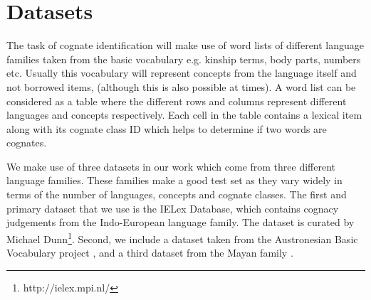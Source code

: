 \documentclass[11pt,letterpaper]{article}
\begin{document}




\section{Datasets}

The task of cognate identification will make use of word lists of different language families taken from the basic vocabulary e.g. kinship terms, body parts, numbers etc. Usually this vocabulary will represent concepts from the language itself and not borrowed items, (although this is also possible at times). A word list can be considered as a table where the different rows and columns represent different languages and concepts respectively. Each cell in the table contains a lexical item along with its cognate class ID which helps to determine if two words are cognates.

We make use of three datasets in our work which come from three different language families. These families make a good test set as they vary widely in terms of the number of languages, concepts and cognate classes. The first and primary dataset that we use is the IELex Database, which contains cognacy judgements from the Indo-European language family. The dataset is curated by Michael Dunn\footnote{http://ielex.mpi.nl/}. Second, we include a dataset taken from the Austronesian Basic Vocabulary project \cite{greenhillBlust:08}, and a third dataset from the Mayan family \cite{wichmann:2008}. 
\end{document}
